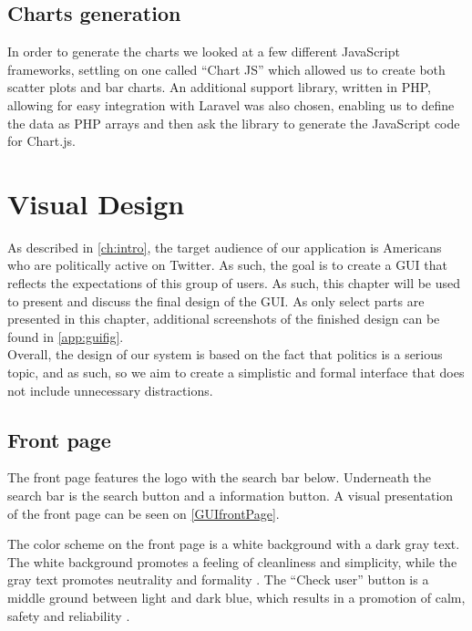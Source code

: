 \subsection{Charts generation}
In order to generate the charts we looked at a few different JavaScript
frameworks, settling on one called ``Chart JS'' which allowed us to create
both scatter plots and bar charts. An additional support library, written in
PHP, allowing for easy integration with Laravel was also chosen, enabling us to
define the data as PHP arrays and then ask the library to generate the
JavaScript code for Chart.js.

\section{Visual Design} \label{sec:gui-visual-design}
As described in \autoref{ch:intro}, the target audience of our application is
Americans who are politically active on Twitter. As such, the goal is to create
a GUI that reflects the expectations of this group of users. As such, this
chapter will be used to present and discuss the final design of the GUI. As only
select parts are presented in this chapter, additional screenshots of the
finished design can be found in \autoref{app:guifig}. \\
Overall, the design of our system is based on the fact that politics is a
serious topic, and as such, so we aim to create a simplistic and formal
interface that does not include unnecessary distractions.

\subsection{Front page}
The front page features the logo with the search bar below. Underneath the
search bar is the search button and a information button. A visual presentation
of the front page can be seen on \autoref{GUIfrontPage}.

{}

The color scheme on the front page is a white background with a dark gray text.
The white background promotes a feeling of cleanliness and simplicity, while the
gray text promotes neutrality and formality \citep[p. 63 \& 64]{WebUI}. 
The ``Check user'' button is a middle ground between light and dark blue, which
results in a promotion of calm, safety and reliability \citep[p. 61]{WebUI}.

